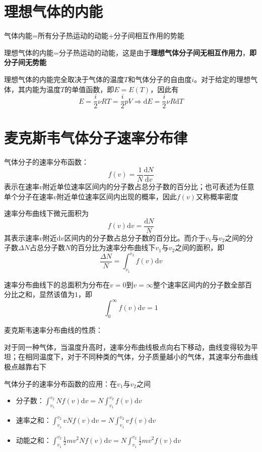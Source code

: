 \documentclass[12pt, a4paper, twoside]{ctexbook}
\begin{document}
\section{理想气体的内能}
{\sonti 气体内能}=所有分子热运动的{\sonti 动能}+分子间相互作用的{\sonti 势能}

{\sonti 理想气体的内能}=分子热运动的{\sonti 动能}，这是由于\textbf{理想气体分子间无相互作用力}，\textbf{即分子间无势能}

理想气体的内能完全取决于气体的温度$T$和气体分子的自由度$i$。对于给定的理想气体，其内能为温度$T$的单值函数，即$E=E\left(T\right)$，因此有
$$
E=\frac{i}{2}\nu RT=\frac{i}{2}pV \Rightarrow\mathrm{d}E=\frac{i}{2}\nu R\mathrm{d}T
$$
\section{麦克斯韦气体分子速率分布律}
{\sonti 气体分子的速率分布函数}：
$$
f\left(v\right)=\frac{1}{N}\frac{\mathrm{d}N}{\mathrm{d}v}
$$
表示在速率$v$附近单位速率区间内的分子数占总分子数的百分比；也可表述为任意单个分子在速率$v$附近单位速率区间内出现的概率，因此$f\left(v\right)$又称概率密度

速率分布曲线下微元面积为
$$
f\left(v\right)\mathrm{d}v=\frac{\mathrm{d}N}{N}
$$
其表示速率$v$附近$\mathrm{d}v$区间内的分子数占总分子数的百分比。而介于$v_1$与$v_2$之间的分子数$\Delta N$占总分子数$N$的百分比为速率分布曲线下$v_1$与$v_2$之间的面积，即
$$
\frac{\Delta N}{N}=\int_{v_1}^{v_2}f\left(v\right)\mathrm{d}v
$$

速率分布曲线下的总面积为分布在$v=0$到$v=\infty$整个速率区间内的分子数全部百分比之和，显然该值为$1$，即
$$
\int_{0}^{\infty}f\left(v\right)\mathrm{d}v=1
$$

{\sonti 麦克斯韦速率分布曲线的性质}：

对于同一种气体，当温度升高时，速率分布曲线极点向右下移动，曲线变得较为平坦；在相同温度下，对于不同种类的气体，分子质量越小的气体，其速率分布曲线极点越靠右下

{\sonti 气体分子的速率分布函数的应用}：在$v_1$与$v_2$之间
\begin{itemize}
    \item 分子数：$\int_{v_1}^{v_2}Nf\left(v\right)\mathrm{d}v=N\int_{v_1}^{v_2}f\left(v\right)\mathrm{d}v$
    \item 速率之和：$\int_{v_1}^{v_2}vNf\left(v\right)\mathrm{d}v=N\int_{v_1}^{v_2}vf\left(v\right)\mathrm{d}v$
    \item 动能之和：$\int_{v_1}^{v_2}\frac{1}{2}mv^2Nf\left(v\right)\mathrm{d}v=N\int_{v_1}^{v_2}\frac{1}{2}mv^2f\left(v\right)\mathrm{d}v$
\end{itemize}
\end{document}
